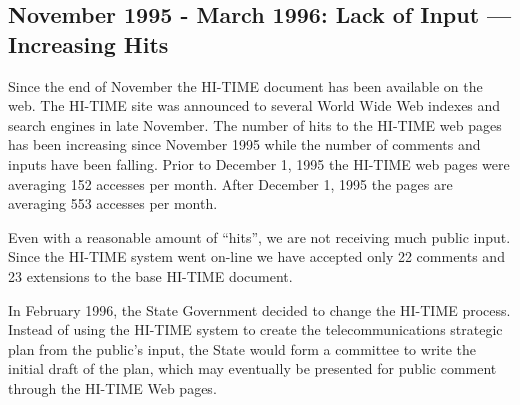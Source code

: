 \subsection{November 1995 - March 1996: Lack of Input --- Increasing Hits}

Since the end of November the HI-TIME document has been available on the
web.  The HI-TIME site was announced to several World Wide Web indexes and
search engines in late November.  The number of hits to the HI-TIME web
pages has been increasing since November 1995 while the number of comments
and inputs have been falling.  Prior to December 1, 1995 the HI-TIME web
pages were averaging 152 accesses per month.  After December 1, 1995 the
pages are averaging 553 accesses per month.


Even with a reasonable amount of ``hits'', we are not receiving much public
input.  Since the HI-TIME system went on-line we have accepted only 22
comments and 23 extensions to the base HI-TIME document. 

In February 1996, the State Government decided to change the HI-TIME
process.  Instead of using the HI-TIME system to create the
telecommunications strategic plan from the public's input, the State would
form a committee to write the initial draft of the plan, which may
eventually be presented for public comment through the HI-TIME Web pages.


